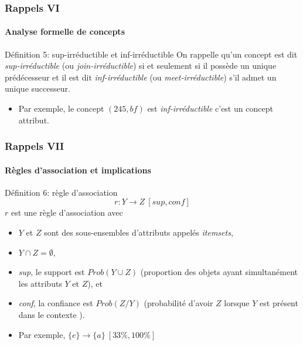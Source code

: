 \documentclass[french]{beamer}
\begin{document}
\begin{frame}
\frametitle{Rappels VI}
\framesubtitle{Analyse formelle de concepts}

\begin{block}{Définition 5: sup-irréductible et inf-irréductible}
On rappelle qu'un concept est dit \emph{sup-irréductible} (ou \emph{join-irréductible}) si et seulement si il possède un unique prédécesseur et il est dit \emph{inf-irréductible} (ou \emph{meet-irréductible}) s'il admet un unique successeur.
\end{block}
\begin{itemize}
  \item Par exemple, le concept $(245, bf)$ est \emph{inf-irréductible} c'est un concept attribut.
\end{itemize}
\end{frame}

\begin{frame}
\frametitle{Rappels VII}
\framesubtitle{Règles d'association et implications}
\begin{block}{Définition 6: règle d'association}
$$r : Y \rightarrow Z\ [sup, conf]$$
$r$ est une règle d'association avec
\begin{itemize}
\item $Y$ et $Z$ sont des sous-ensembles d'attributs appelés \textit{itemsets},
\item $Y \cap Z = \emptyset$,
\item \textit{sup}, le support est $Prob(Y \cup Z)$ (proportion des objets ayant simultanément les attributs $Y$ et $Z$), et
\item \textit{conf}, la confiance est $Prob(Z/Y)$ (probabilité d'avoir $Z$ lorsque $Y$ est présent dans le contexte \context).
\end{itemize}
\end{block}
\begin{itemize}
  \item Par exemple, $\{e\} \rightarrow \{a\}\ [33\%,100\%]$ 
\end{itemize}
\end{frame}
\end{document}
